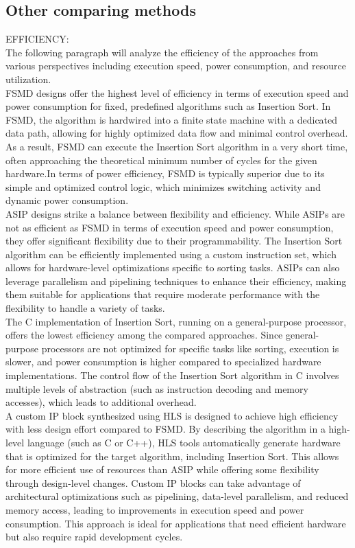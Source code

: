 \documentclass[conference]{IEEEtran}
\begin{document}
\subsection{Other comparing methods}
EFFICIENCY:\\
The following paragraph will analyze the efficiency of the approaches from various perspectives including execution speed, power consumption, and resource utilization.\\
FSMD designs offer the highest level of efficiency in terms of execution speed and power consumption for fixed, predefined algorithms such as Insertion Sort. In FSMD, the algorithm is hardwired into a finite state machine with a dedicated data path, allowing for highly optimized data flow and minimal control overhead. As a result, FSMD can execute the Insertion Sort algorithm in a very short time, often approaching the theoretical minimum number of cycles for the given hardware.In terms of power efficiency, FSMD is typically superior due to its simple and optimized control logic, which minimizes switching activity and dynamic power consumption.\\
ASIP designs strike a balance between flexibility and efficiency. While ASIPs are not as efficient as FSMD in terms of execution speed and power consumption, they offer significant flexibility due to their programmability. The Insertion Sort algorithm can be efficiently implemented using a custom instruction set, which allows for hardware-level optimizations specific to sorting tasks. ASIPs can also leverage parallelism and pipelining techniques to enhance their efficiency, making them suitable for applications that require moderate performance with the flexibility to handle a variety of tasks.\\
The C implementation of Insertion Sort, running on a general-purpose processor, offers the lowest efficiency among the compared approaches. Since general-purpose processors are not optimized for specific tasks like sorting, execution is slower, and power consumption is higher compared to specialized hardware implementations. The control flow of the Insertion Sort algorithm in C involves multiple levels of abstraction (such as instruction decoding and memory accesses), which leads to additional overhead.\\
A custom IP block synthesized using HLS is designed to achieve high efficiency with less design effort compared to FSMD. By describing the algorithm in a high-level language (such as C or C++), HLS tools automatically generate hardware that is optimized for the target algorithm, including Insertion Sort. This allows for more efficient use of resources than ASIP while offering some flexibility through design-level changes. Custom IP blocks can take advantage of architectural optimizations such as pipelining, data-level parallelism, and reduced memory access, leading to improvements in execution speed and power consumption. This approach is ideal for applications that need efficient hardware but also require rapid development cycles.\\
\end{document}
